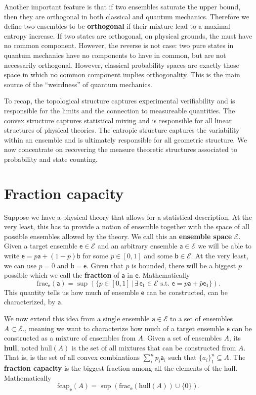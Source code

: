 \documentclass[10pt,twocolumn, nofootinbib]{revtex4-2}
\newcommand\hull{\mathrm{hull}}
\newcommand\fraction{\mathrm{frac}}
\newcommand\frcap{\mathrm{fcap}}
\newcommand{\ens}[1][e] {\mathsf{#1}} %
\newcommand{\Ens}[1][E] {\mathcal{#1}} %
\begin{document}
Another important feature is that if two ensembles saturate the upper bound, then they are orthogonal in both classical and quantum mechanics. Therefore we define two ensembles to be \textbf{orthogonal} if their mixture lead to a maximal entropy increase. If two states are orthogonal, on physical grounds, the must have no common component. However, the reverse is not case: two pure states in quantum mechanics have no components to have in common, but are not necessarily orthogonal. However, classical probability spaces are exactly those space in which no common component implies orthogonality. This is the main source of the ``weirdness'' of quantum mechanics.

To recap, the topological structure captures experimental verifiability and is responsible for the limits and the connection to measureable quantities. The convex structure captures statistical mixing and is responsible for all linear structures of physical theories. The entropic structure captures the variability within an ensemble and is ultimately responsible for all geometric structure. We now concentrate on recovering the measure theoretic structures associated to probability and state counting.

\section{Fraction capacity}

Suppose we have a physical theory that allows for a statistical description. At the very least, this has to provide a notion of ensemble together with the space of all possible ensembles allowed by the theory. We call this an \textbf{ensemble space} $\Ens$. 
Given a target ensemble $\ens \in \Ens$ and an arbitrary ensemble $\ens[a] \in \Ens$ we will be able to write $\ens = p \ens[a] + (1-p) \ens[b]$ for some $p \in [0,1]$ and some $\ens[b] \in \Ens$. At the very least, we can use $p=0$ and $\ens[b] = \ens$. Given that $p$ is bounded, there will be a biggest $p$ possible which we call the \textbf{fraction} of $\ens[a]$ in $\ens$. Mathematically
\begin{equation}
	\fraction_{\ens}(\ens[a]) = \sup(\{ p \in [0,1] \, | \, \exists \, \ens_1 \in \Ens \text{ s.t. }  \ens = p \ens[a] + \bar{p} \ens_1 \}).
\end{equation}
This quantity tells us how much of ensemble $\ens$ can be constructed, can be characterized, by $\ens[a]$. 

We now extend this idea from a single ensemble $\ens[a] \in \Ens$ to a set of ensembles $A \subset \Ens$., meaning we want to characterize how much of a target ensemble $\ens$ can be constructed as a mixture of ensembles from $A$. Given a set of ensembles $A$, its \textbf{hull}, noted $\hull(A)$ is the set of all mixtures that can be constructed from $A$. That is, is the set of all convex combinations $\sum_i^n p_i \ens[a]_i$ such that $\{a_i\}_1^n \subseteq A$. The \textbf{fraction capacity} is the biggest fraction among all the elements of the hull. Mathematically
\begin{equation}
	\frcap_{\ens}(A) = \sup(\fraction_{\ens}(\hull(A))\cup\{0\}).
\end{equation}
\end{document}
